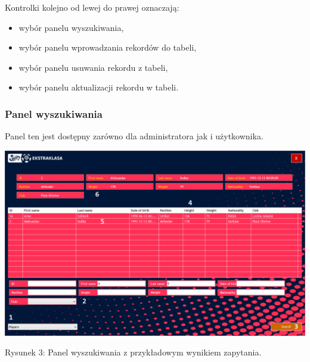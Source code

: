 \documentclass[12pt,a4paper]{article}
\begin{document}
    Kontrolki kolejno od lewej do prawej oznaczają:
    \begin{itemize}
        \item wybór panelu wyszukiwania,
        \item wybór panelu wprowadzania rekordów do tabeli,
        \item wybór panelu usuwania rekordu z tabeli,
        \item wybór panelu aktualizacji rekordu w tabeli.
    \end{itemize}

    \subsubsection{Panel wyszukiwania}
    Panel ten jest dostępny zarówno dla administratora jak i użytkownika.
    \begin{center}
        \includegraphics[scale=0.47]{select-panel.png}
        \begin{flushleft}
            \begin{scriptsize}
            \begin{list}{}{\leftmargin=13.5em}\raggedright\item\relax
            Rysunek 3: Panel wyszukiwania z przykładowym wynikiem zapytania.
            \end{list}
            \end{scriptsize}
        \end{flushleft}
    \end{center}
\end{document}
